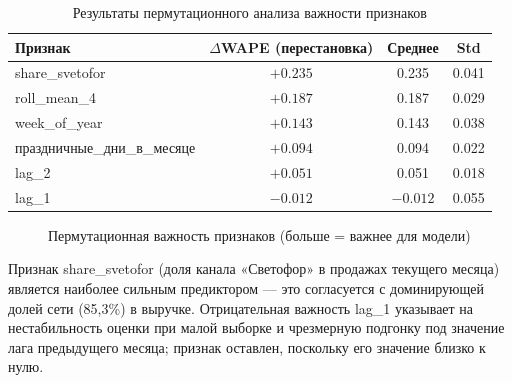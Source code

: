 \begin{table}[H]
\centering
\caption{Результаты пермутационного анализа важности признаков}
\label{tab:feature_importance}
\begin{tabular}{lccc}
\toprule
\textbf{Признак} & \textbf{$\Delta$WAPE (перестановка)} & \textbf{Среднее} & \textbf{Std} \\
\midrule
share\_svetofor & $+0.235$ & 0.235 & 0.041 \\
roll\_mean\_4 & $+0.187$ & 0.187 & 0.029 \\
week\_of\_year & $+0.143$ & 0.143 & 0.038 \\
праздничные\_дни\_в\_месяце & $+0.094$ & 0.094 & 0.022 \\
lag\_2 & $+0.051$ & 0.051 & 0.018 \\
lag\_1 & $-0.012$ & $-0.012$ & 0.055 \\
\bottomrule
\end{tabular}
\end{table}

\begin{figure}[H]
\centering
{}
\caption{Пермутационная важность признаков (больше = важнее для модели)}
\label{fig:feature_importance_chart}
\end{figure}

Признак share\_svetofor (доля канала «Светофор» в продажах текущего месяца) является наиболее сильным предиктором --- это согласуется с доминирующей долей сети (85,3\%) в выручке. Отрицательная важность lag\_1 указывает на нестабильность оценки при малой выборке и чрезмерную подгонку под значение лага предыдущего месяца; признак оставлен, поскольку его значение близко к нулю.

